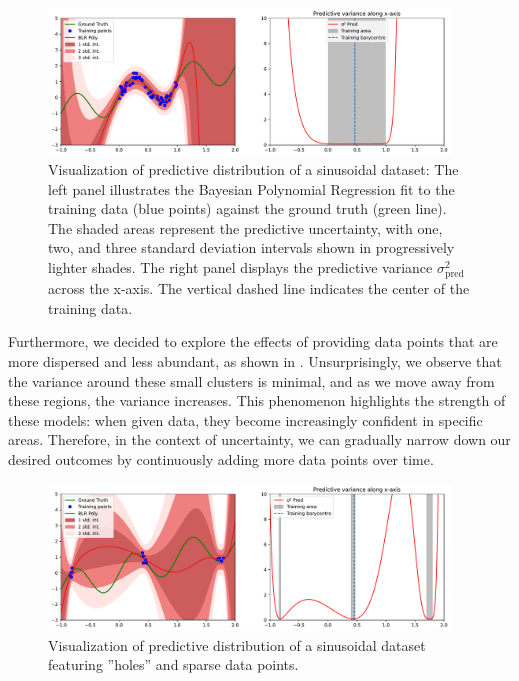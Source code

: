 \begin{figure}[H]
    \centering
    \includegraphics[width=0.95\textwidth]{phi_polynomial.pdf}
    \caption{Visualization of predictive distribution of a sinusoidal dataset: The left panel illustrates the Bayesian Polynomial Regression fit to the training data (blue points) against the ground truth (green line). The shaded areas represent the predictive uncertainty, with one, two, and three standard deviation intervals shown in progressively lighter shades. The right panel displays the predictive variance $\sigma^2_{\text{pred}}$ across the x-axis. The vertical dashed line indicates the center of the training data.}
    \label{fig:phi_polynomial}
\end{figure}

Furthermore, we decided to explore the effects of providing data points that are more dispersed and less abundant, as shown in . Unsurprisingly, we observe that the variance around these small clusters is minimal, and as we move away from these regions, the variance increases. This phenomenon highlights the strength of these models: when given data, they become increasingly confident in specific areas. Therefore, in the context of uncertainty, we can gradually narrow down our desired outcomes by continuously adding more data points over time.

\begin{figure}[H]
    \centering
    \includegraphics[width=0.95\textwidth]{phi_polynomial_hole.pdf}
    \caption{Visualization of predictive distribution of a sinusoidal dataset featuring ''holes'' and sparse data points.}
    \label{fig:phi_polynomial_hole}
\end{figure}

